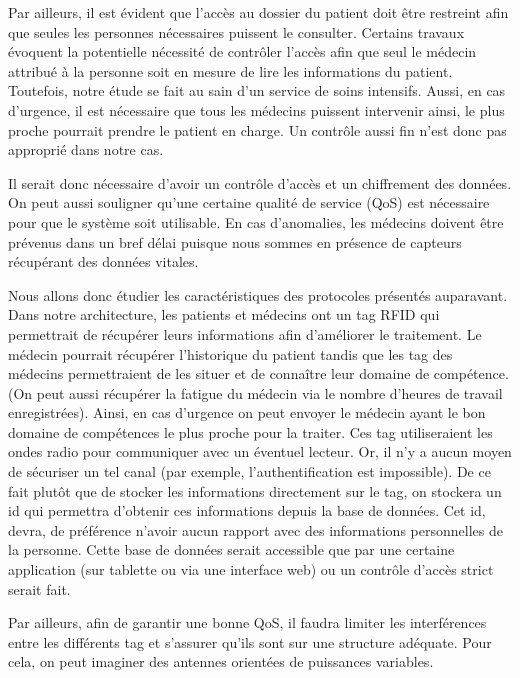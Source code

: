 \documentclass{article}
\begin{document}
Par ailleurs, il est évident que l’accès au dossier du patient doit être restreint afin que seules les personnes nécessaires puissent le consulter. Certains travaux évoquent la potentielle nécessité de contrôler l’accès afin que seul le médecin attribué à la personne soit en mesure de lire les informations du patient. Toutefois, notre étude se fait au sain d’un service de soins intensifs. Aussi, en cas d’urgence, il est nécessaire que tous les médecins puissent intervenir ainsi, le plus proche pourrait prendre le patient en charge. Un contrôle aussi fin n’est donc pas approprié dans notre cas.

Il serait donc nécessaire d’avoir un contrôle d’accès et un chiffrement des données. On peut aussi souligner qu’une certaine qualité de service (QoS) est nécessaire pour que le système soit utilisable. En cas d’anomalies, les médecins doivent être prévenus dans un bref délai puisque nous sommes en présence de capteurs récupérant des données vitales. 

Nous allons donc étudier les caractéristiques des protocoles présentés auparavant.
\\

Dans notre architecture, les patients et médecins ont un tag RFID qui permettrait de récupérer leurs informations afin d’améliorer le traitement. Le médecin pourrait récupérer l’historique du patient tandis que les tag des médecins permettraient de les situer et de connaître leur domaine de compétence. (On peut aussi récupérer la fatigue du médecin via le nombre d’heures de travail enregistrées). Ainsi, en cas d’urgence on peut envoyer le médecin ayant le bon domaine de compétences le plus proche pour la traiter. Ces tag utiliseraient les ondes radio pour communiquer avec un éventuel lecteur. Or, il n’y a aucun moyen de sécuriser un tel canal (par exemple, l’authentification est impossible). De ce fait plutôt que de stocker les informations directement sur le tag, on stockera un id qui permettra d’obtenir ces informations depuis la base de données. Cet id, devra, de préférence n’avoir aucun rapport avec des informations personnelles de la personne. Cette base de données serait accessible que par une certaine application (sur tablette ou via une interface web) ou un contrôle d’accès strict serait fait.

Par ailleurs, afin de garantir une bonne QoS, il faudra limiter les interférences entre les différents tag et s’assurer qu’ils sont sur une structure adéquate. Pour cela, on peut imaginer des antennes orientées de puissances variables. 
\\
\end{document}
